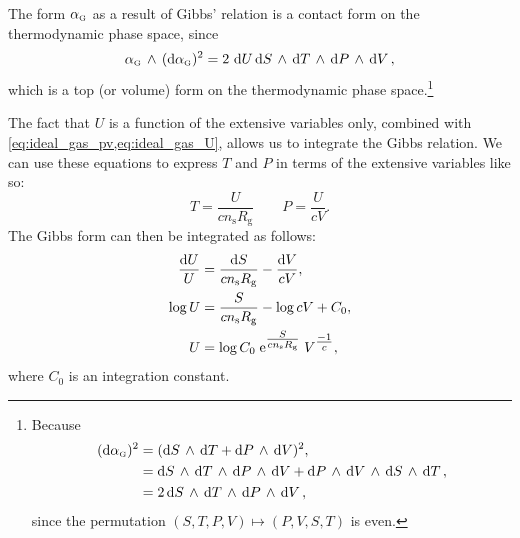 The form $\alpha_\text{\tiny G}$ as a result of Gibbs' relation is a contact form on the thermodynamic phase space, since
$$  \alpha_\text{\tiny G}\,\wedge\,(\dd{\alpha_\text{\tiny G}})^2  = 2\,\dd{U}  \dd{S}\,\wedge\,\dd{T} \,\wedge\, \dd{P}\,\wedge\,\dd{V}  , $$
which is a top (or volume) form on the thermodynamic phase space.\footnote
{
    Because 
    \begin{equation*} 
        \begin{split}
            (\dd{\alpha_\text{\tiny G}})^2 &= ( \dd{S}\,\wedge\,\dd{T}  +  \dd{P}\,\wedge\,\dd{V} )^2, \\
                            &=   \dd{S}\,\wedge\,\dd{T} \,\wedge\, \dd{P}\,\wedge\,\dd{V}   +   \dd{P}\,\wedge\,\dd{V} \,\wedge\, \dd{S}\,\wedge\,\dd{T}  , \\
                            &= 2  \dd{S}\,\wedge\,\dd{T} \,\wedge\, \dd{P}\,\wedge\,\dd{V}  , \\
        \end{split}
    \end{equation*}
    since the permutation $ (S, T, P, V) \mapsto (P, V, S, T) $ is even.
}


The fact that $U$ is a function of the extensive variables only, combined with \cref{eq:ideal_gas_pv,eq:ideal_gas_U}, allows us to integrate the Gibbs relation. We can use these equations to express $T$ and $P$ in terms of the extensive variables like so:
$$ T = \frac{U}{cn_\text{s}R_\text{g}} \qquad P = \frac{U}{cV}. $$
The Gibbs form can then be integrated as follows:
\begin{equation*}
    \begin{split}
        \frac{\dd{U}}{U} &= \frac{\dd{S}}{cn_\text{s}R_\text{g}} - \frac{\dd{V}}{c V},\\
        \log{U}  &= \frac{S}{ cn_\text{s}R_\text{g}} - \log{c V} + C_0, \\
        U  &= \log{C_0} \; \mathrm{e}^{\tfrac{S}{ cn_\text{s}R_\text{g}}} \; V^{\tfrac{-1}{c}},\\
    \end{split}
\end{equation*}
where $C_0$ is an integration constant.

